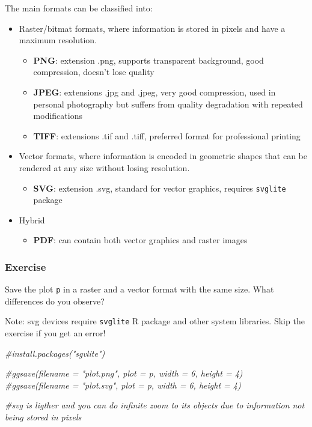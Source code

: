 \documentclass[
]{article}
\newenvironment{Shaded}{\begin{snugshade}}{\end{snugshade}}
\newcommand{\CommentTok}[1]{\textcolor[rgb]{0.56,0.35,0.01}{\textit{#1}}}
\providecommand{\tightlist}{%
  \setlength{\itemsep}{0pt}\setlength{\parskip}{0pt}}
\begin{document}
The main formats can be classified into:

\begin{itemize}
\tightlist
\item
  Raster/bitmat formats, where information is stored in pixels and have
  a maximum resolution.

  \begin{itemize}
  \tightlist
  \item
    \textbf{PNG}: extension .png, supports transparent background, good
    compression, doesn't lose quality
  \item
    \textbf{JPEG}: extensions .jpg and .jpeg, very good compression,
    used in personal photography but suffers from quality degradation
    with repeated modifications
  \item
    \textbf{TIFF}: extensions .tif and .tiff, preferred format for
    professional printing
  \end{itemize}
\item
  Vector formats, where information is encoded in geometric shapes that
  can be rendered at any size without losing resolution.

  \begin{itemize}
  \tightlist
  \item
    \textbf{SVG}: extension .svg, standard for vector graphics, requires
    \texttt{svglite} package
  \end{itemize}
\item
  Hybrid

  \begin{itemize}
  \tightlist
  \item
    \textbf{PDF}: can contain both vector graphics and raster images
  \end{itemize}
\end{itemize}

\subsubsection{\texorpdfstring{ Exercise}{ Exercise}}\label{exercise-4}

Save the plot \texttt{p} in a raster and a vector format with the same
size. What differences do you observe?

Note: svg devices require \texttt{svglite} R package and other system
libraries. Skip the exercise if you get an error!

\begin{Shaded}
\begin{Highlighting}[]
\CommentTok{\#install.packages("sgvlite")}

\CommentTok{\#ggsave(filename = "plot.png", plot = p, width = 6, height = 4) }
\CommentTok{\#ggsave(filename = "plot.svg", plot = p, width = 6, height = 4) }

\CommentTok{\#svg is ligther and you can do infinite zoom to its objects due to information not being stored in pixels}
\end{Highlighting}
\end{Shaded}
\end{document}
